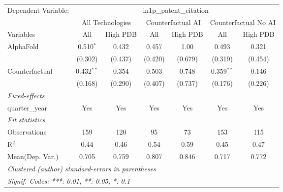 \begingroup
\centering
\begin{tabular}{lcccccc}
   \tabularnewline \midrule \midrule
   Dependent Variable: & \multicolumn{6}{c}{ln1p\_patent\_citation}\\
 & \multicolumn{2}{c}{All Technologies} & \multicolumn{2}{c}{Counterfactual AI} & \multicolumn{2}{c}{Counterfactual No AI} \\
\cmidrule(lr){1-1}\cmidrule(lr){2-3} \cmidrule(lr){4-5} \cmidrule(lr){6-7}
Variables & \multicolumn{1}{c}{All} & \multicolumn{1}{c}{High PDB} & \multicolumn{1}{c}{All} & \multicolumn{1}{c}{High PDB} & \multicolumn{1}{c}{All} & \multicolumn{1}{c}{High PDB} \\
\cmidrule(lr){1-1}\cmidrule(lr){2-2} \cmidrule(lr){3-3} \cmidrule(lr){4-4} \cmidrule(lr){5-5} \cmidrule(lr){6-6} \cmidrule(lr){7-7}
   AlphaFold      & 0.510$^{*}$  & 0.432   & 0.457   & 1.00    & 0.493        & 0.321\\   
                  & (0.302)      & (0.437) & (0.420) & (0.679) & (0.319)      & (0.454)\\   
   Counterfactual & 0.432$^{**}$ & 0.354   & 0.503   & 0.748   & 0.359$^{**}$ & 0.146\\   
                  & (0.168)      & (0.290) & (0.407) & (0.737) & (0.176)      & (0.226)\\   
   \midrule
   \emph{Fixed-effects}\\
   quarter\_year  & Yes          & Yes     & Yes     & Yes     & Yes          & Yes\\  
   \midrule
   \emph{Fit statistics}\\
   Observations   & 159          & 120     & 95      & 73      & 153          & 115\\  
   R$^2$          & 0.44         & 0.46    & 0.54    & 0.59    & 0.45         & 0.47\\  
Mean(Dep. Var.) & 0.705 & 0.759 & 0.807 & 0.846 & 0.717 & 0.772 \\
   \midrule \midrule
   \multicolumn{7}{l}{\emph{Clustered (author) standard-errors in parentheses}}\\
   \multicolumn{7}{l}{\emph{Signif. Codes: ***: 0.01, **: 0.05, *: 0.1}}\\
\end{tabular}
\par\endgroup
